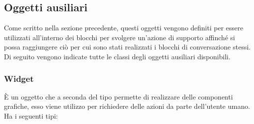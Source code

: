\subsection{Oggetti ausiliari}
Come scritto nella sezione precedente, questi oggetti vengono definiti per essere utilizzati all’interno dei blocchi per svolgere un'azione di supporto affinché si possa raggiungere ciò per cui sono stati realizzati i blocchi di conversazione stessi.\\

Di seguito vengono indicate tutte le classi degli oggetti ausiliari disponibili.

\subsubsection*{Widget}
È un oggetto che a seconda del tipo permette di realizzare delle componenti grafiche, esso viene utilizzo per richiedere delle azioni da parte dell’utente umano.
Ha i seguenti tipi:
